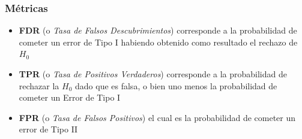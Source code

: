 \documentclass[14pt]{beamer}
\begin{document}
\begin{frame} \frametitle{M\'etricas}
 \small
\begin{itemize}
 \item \textbf{FDR} (o \textit{Tasa de Falsos Descubrimientos}) corresponde a la probabilidad 
 de cometer un error de Tipo I habiendo obtenido como resultado el rechazo de $H_0$
 \item \textbf{TPR} (o \textit{Tasa de Positivos Verdaderos}) corresponde a la probabilidad de 
 rechazar la $H_0$ dado que es falsa, o bien uno menos la probabilidad de cometer un Error de Tipo I
\item \textbf{FPR} (o \textit{Tasa de Falsos Positivos}) el cual es la probabilidad de cometer un error de Tipo II
\end{itemize}
\end{frame}
\end{document}
